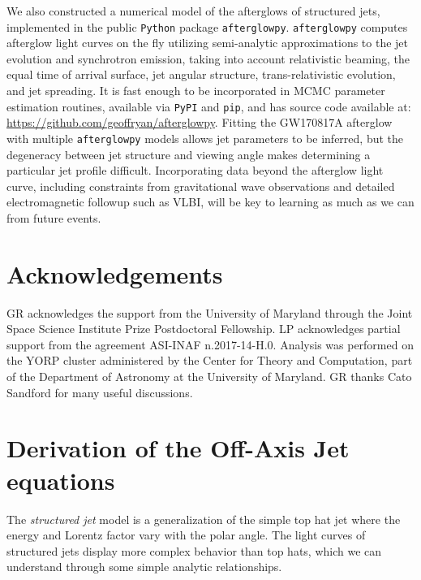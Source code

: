 \documentclass[twocolumn]{aastex62}
\newcommand{\gwbns}{GW170817A}
\newcommand{\afterglowpy}{{\tt afterglowpy}}
\newcommand{\python}{{\tt Python}}
\begin{document}
We also constructed a numerical model of the afterglows of structured jets, implemented in the public \python{} package \afterglowpy{}. \afterglowpy{} computes afterglow light curves on the fly utilizing semi-analytic approximations to the jet evolution and synchrotron emission, taking into account relativistic beaming, the equal time of arrival surface, jet angular structure, trans-relativistic evolution, and jet spreading.  It is fast enough to be incorporated in MCMC parameter estimation routines, available via {\tt PyPI} and {\tt pip}, and has source code available at: \url{https://github.com/geoffryan/afterglowpy}. Fitting the \gwbns{} afterglow with multiple \afterglowpy{} models allows jet parameters to be inferred, but the degeneracy between jet structure and viewing angle makes determining a particular jet profile difficult.  Incorporating data beyond the afterglow light curve, including constraints from gravitational wave observations and detailed electromagnetic followup such as VLBI, will be key to learning as much as we can from future events.

\section{Acknowledgements} \label{sec:acknowledgements}

GR acknowledges the support from the University of Maryland through the Joint Space Science Institute Prize Postdoctoral Fellowship. LP acknowledges partial support from the agreement ASI-INAF n.2017-14-H.0. Analysis was performed on the YORP cluster administered by the Center for Theory and Computation, part of the Department of Astronomy at the University of Maryland.  GR thanks Cato Sandford for many useful discussions.



\appendix
\section{Derivation of the Off-Axis Jet equations}\label{app:derive1}

  The \emph{structured jet} model is a generalization of the simple top hat jet where the energy and Lorentz factor vary with the polar angle.  The light curves of structured jets display more complex behavior than top hats, which we can understand through some simple analytic relationships.
  
\end{document}
